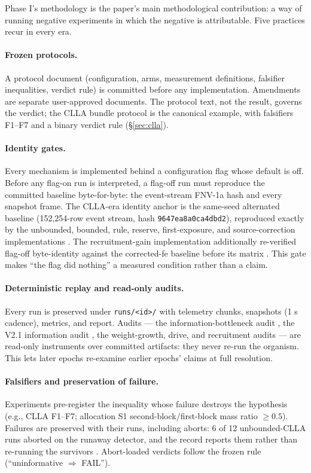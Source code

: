 Phase I's methodology is the paper's main methodological contribution:
a way of running negative experiments in which the negative is
attributable. Five practices recur in every era.

\paragraph{Frozen protocols.}
A protocol document (configuration, arms, measurement definitions,
falsifier inequalities, verdict rule) is committed before any
implementation. Amendments are separate user-approved documents. The
protocol text, not the result, governs the verdict; the CLLA bundle
protocol \cite{cllaprot} is the canonical example, with falsifiers
F1--F7 and a binary verdict rule (\S\ref{sec:clla}).

\paragraph{Identity gates.}
Every mechanism is implemented behind a configuration flag whose
default is off. Before any flag-on run is interpreted, a flag-off run
must reproduce the committed baseline byte-for-byte: the event-stream
FNV-1a hash and every snapshot frame. The CLLA-era identity anchor is
the same-seed alternated baseline (152{,}254-row event stream, hash
\texttt{9647ea8a0ca4dbd2}), reproduced exactly by the unbounded,
bounded, rule, reserve, first-exposure, and source-correction
implementations \cite{cllarecord,bbounded,rule,reserve,fe,fec}. The
recruitment-gain implementation additionally re-verified flag-off
byte-identity against the corrected-fe baseline before its matrix
\cite{rg8}. This gate makes ``the flag did nothing'' a measured
condition rather than a claim.

\paragraph{Deterministic replay and read-only audits.}
Every run is preserved under \texttt{runs/<id>/} with telemetry chunks,
snapshots (1 s cadence), metrics, and report. Audits --- the
information-bottleneck audit \cite{synmem}, the V2.1 information audit
\cite{infoaudit}, the weight-growth, drive, and recruitment audits
\cite{wgrowth,drive} --- are read-only instruments over committed
artifacts: they never re-run the organism. This lets later epochs
re-examine earlier epochs' claims at full resolution.

\paragraph{Falsifiers and preservation of failure.}
Experiments pre-register the inequality whose failure destroys the
hypothesis (e.g., CLLA F1--F7; allocation S1 second-block/first-block
mass ratio \(\ge 0.5\)). Failures are preserved with their runs,
including aborts: 6 of 12 unbounded-CLLA runs aborted on the runaway
detector, and the record reports them rather than re-running the
survivors \cite{cllarecord}. Abort-loaded verdicts follow the frozen
rule (``uninformative $\Rightarrow$ FAIL'').


